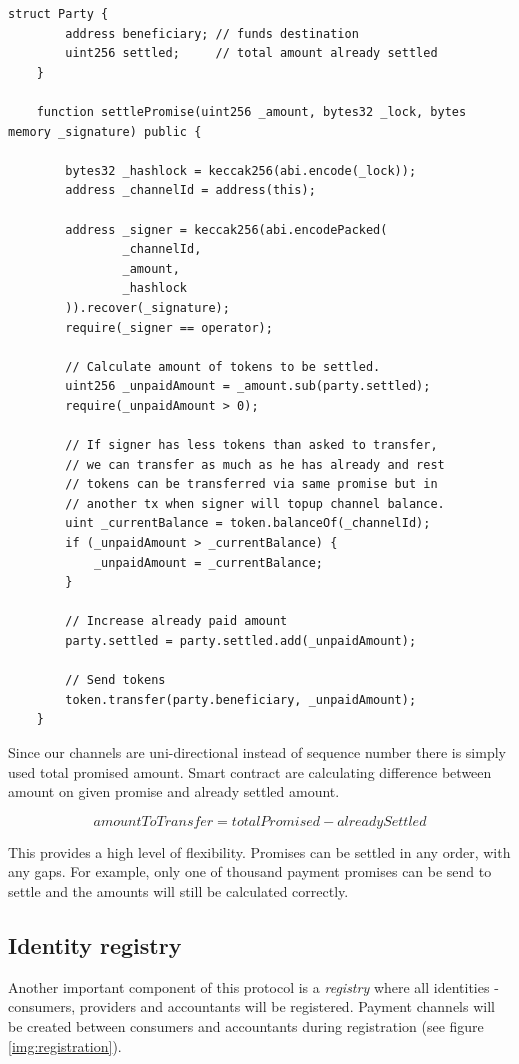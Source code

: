 \documentclass[a4paper,12pt]{article}
\begin{document}
\begin{lstlisting}[language=Solidity]
    struct Party {
        address beneficiary; // funds destination
        uint256 settled;     // total amount already settled
    }

    function settlePromise(uint256 _amount, bytes32 _lock, bytes memory _signature) public {

        bytes32 _hashlock = keccak256(abi.encode(_lock));
        address _channelId = address(this);

        address _signer = keccak256(abi.encodePacked(
                _channelId, 
                _amount, 
                _hashlock
        )).recover(_signature);
        require(_signer == operator);

        // Calculate amount of tokens to be settled.
        uint256 _unpaidAmount = _amount.sub(party.settled);
        require(_unpaidAmount > 0);

        // If signer has less tokens than asked to transfer, 
        // we can transfer as much as he has already and rest 
        // tokens can be transferred via same promise but in 
        // another tx when signer will topup channel balance.
        uint _currentBalance = token.balanceOf(_channelId);
        if (_unpaidAmount > _currentBalance) {
            _unpaidAmount = _currentBalance;
        }

        // Increase already paid amount
        party.settled = party.settled.add(_unpaidAmount);

        // Send tokens
        token.transfer(party.beneficiary, _unpaidAmount);
    }
\end{lstlisting}

Since our channels are uni-directional instead of sequence number there is simply
used total promised amount. Smart contract are calculating difference between 
amount on given promise and already settled amount.

\[ amountToTransfer = totalPromised - alreadySettled \]

This provides a high level of flexibility. Promises can be settled in any order,
with any gaps. For example, only one of thousand payment promises can be send to 
settle and the amounts will still be calculated correctly.

\subsection{Identity registry}

Another important component of this protocol is a \textit{registry} where all 
identities - consumers, providers and accountants will be registered. Payment 
channels will be created between consumers and accountants during registration 
(see figure \ref{img:registration}). 
\end{document}
